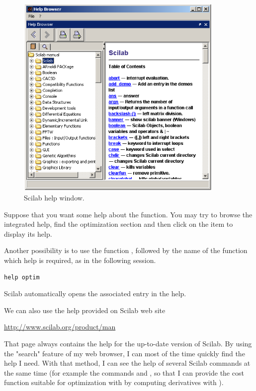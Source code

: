 \begin{figure}
\begin{center}
\includegraphics[width=10cm]{introscilab/scilab-help.png}
\end{center}
\caption{Scilab help window.}
\label{fig-scilab-help}
\end{figure}

Suppose that you want some help about the 
function. You may try to browse the integrated help, find the optimization
section and then click on the  item
to display its help.

Another possibility is to use the function , followed 
by the name of the function which help is required, as in the following 
session.
\lstset{language=scilabscript}
\begin{lstlisting}
help optim
\end{lstlisting}
Scilab automatically opens the associated entry
in the help.

We can also use the help provided on Scilab web site
\begin{center}
\url{http://www.scilab.org/product/man}
\end{center}

That page always contains the help for the up-to-date
version of Scilab. By using the "search" feature of my
web browser, I can most of the time quickly find the help 
I need. With that method, I can see the help of several Scilab 
commands at the same time (for example the commands 
and , so that I can provide the cost function
suitable for optimization with  by computing
derivatives with ).

